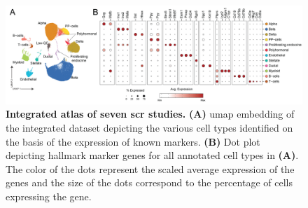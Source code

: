 



\begin{figure}[b!]
\centering
\includegraphics[width=\linewidth]{Chapter5/Fig/F3-2-v2-01.png}
\caption[Integrated atlas of seven  studies]{\textbf{Integrated atlas of seven \gls{scr} studies.} \textbf{(A)} \gls{umap} embedding of the integrated dataset depicting the various cell types identified on the basis of the expression of known markers. \textbf{(B)} Dot plot depicting hallmark marker genes for all annotated cell types in \textbf{(A)}. The color of the dots represent the scaled average expression of the genes and the size of the dots correspond to the percentage of cells expressing the gene.}
\label{fig:chp3_fulldata}
\end{figure}

